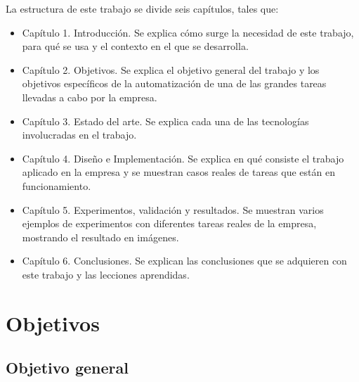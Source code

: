 \documentclass[a4paper, 12pt]{book}
\begin{document}
La estructura de este trabajo se divide seis capítulos, tales que:

\begin{itemize}
\item Capítulo 1. Introducción.
Se explica cómo surge la necesidad de este trabajo, para qué se usa y el contexto en el que se desarrolla.

\item Capítulo 2. Objetivos.
Se explica el objetivo general del trabajo y los objetivos específicos de la automatización de una de las grandes tareas llevadas a cabo por la empresa.

\item Capítulo 3. Estado del arte.
Se explica cada una de las tecnologías involucradas en el trabajo.

\item Capítulo 4. Diseño e Implementación.
Se explica en qué consiste el trabajo aplicado en la empresa y se muestran casos reales de tareas que están en funcionamiento.

\item Capítulo 5. Experimentos, validación y resultados.
Se muestran varios ejemplos de experimentos con diferentes tareas reales de la empresa, mostrando el resultado en imágenes.

\item Capítulo 6. Conclusiones.
Se explican las conclusiones que se adquieren con este trabajo y las lecciones aprendidas.

\end{itemize}






\cleardoublepage %
\chapter{Objetivos} %
\label{chap:objetivos} %

\section{Objetivo general} %
\label{sec:objetivo-general} %
\end{document}
